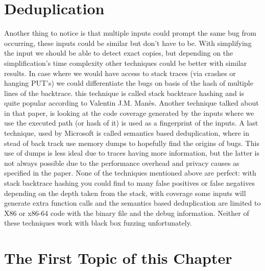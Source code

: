 \section{Deduplication}
Another thing to notice is that multiple inputs could prompt the same bug from occurring, these inputs could be similar but don't have to be. With simplifying the input we should be able to detect exact copies, but depending on the simplification's time complexity other techniques could be better with similar results. In case where we would have access to stack traces (via crashes or hanging PUT's) we could differentiate the bugs on basis of the hash of multiple lines of the backtrace. this technique is called stack backtrace hashing and is quite popular according to Valentin J.M. Man\`es\cite{13manes2019survey}. Another technique talked about in that paper, is looking at the code coverage generated by the inputs where we use the executed path (or hash of it) is used as a fingerprint of the inputs. A last technique, used by Microsoft\cite{36semanticsAwareDeduplicationRETracer} is called semantics based deduplication, where in stead of back track use memory dumps to hopefully find the origins of bugs. This use of dumps is less ideal due to traces having more information, but the latter is not always possible due to the performance overhead and privacy causes as specified in the paper. None of the techniques mentioned above are perfect: with stack backtrace hashing you could find to many false positives or false negatives depending on the depth taken from the stack, with coverage some inputs will generate extra function calls and the semantics based deduplication are limited to X86 or x86-64 code with the binary file and the debug information. Neither of these techniques work with black box fuzzing unfortunately.

%
%



\section{The First Topic of this Chapter}
%


